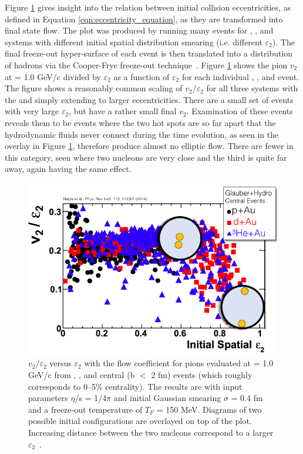 Figure \ref{fig:v2_epsi2_ampt} gives insight into the relation between initial collision eccentricities, as defined in Equation \ref{eqn:eccentricity_equation}, as they are transformed into final state flow. The plot was produced by running many events for \pau, \dau, and \hau systems with different initial spatial distribution smearing (i.e. different $\varepsilon_2$). The final freeze-out hyper-surface of each event is then translated into a distribution of hadrons via the Cooper-Frye freeze-out technique~\cite{PhysRevD.10.186}. Figure \ref{fig:v2_epsi2_ampt} shows the pion $v_2$ at \pt = 1.0 GeV/c divided by $\varepsilon_2$ as a function of $\varepsilon_2$ for each individual \pau, \dau, and \hau event. The figure shows a reasonably common scaling of $v_2/\varepsilon_2$ for all three systems with the \dau and \hau simply extending to larger eccentricities. There are a small set of events with very large $\varepsilon_2$, but have a rather small final $v_2$. Examination of these events reveals them to be \dau events where the two hot spots are so far apart that the hydrodynamic fluids never connect during the time evolution, as seen in the overlay in Figure \ref{fig:v2_epsi2_ampt}, therefore produce almost no elliptic flow. There are fewer \hau in this category, seen where two nucleons are very close and the third is quite far away, again having the same effect.

\begin{figure}[!ht]
\begin{center}
\includegraphics[width=0.6\linewidth]{figs/v2_e2_ampt.png}
\caption{$v_2/\varepsilon_2$ versus $\varepsilon_2$ with the flow coefficient
for pions evaluated at \pt = 1.0 GeV/c from \pau,
\dau, and \hau central (b $<$ 2 fm) events (which roughly corresponds to 0--5\% centrality). The results
are with input parameters $\eta$/s = 1/4$\pi$ and initial Gaussian
smearing $\sigma$ = 0.4 fm and a freeze-out temperature of $T_F$ = 150
MeV. Diagrams of two possible \dau initial configurations are overlayed on top of the plot. Increasing distance between the two \dau nucleons correspond to a larger $\varepsilon_2$~\cite{PhysRevLett.113.112301}.}
\label{fig:v2_epsi2_ampt}
\end{center}
\end{figure}


